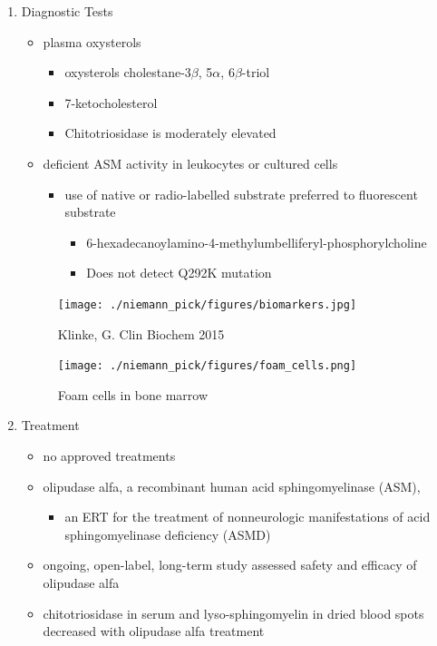 \documentclass{scrartcl}
\begin{document}
\begin{enumerate}
\item Diagnostic Tests
\label{sec:org111b475}
\begin{itemize}
\item plasma oxysterols
\begin{itemize}
\item oxysterols cholestane-3\(\beta\), 5\(\alpha\), 6\(\beta\)-triol
\item 7-ketocholesterol
\item Chitotriosidase is moderately elevated
\end{itemize}
\item deficient ASM activity in leukocytes or cultured cells
\begin{itemize}
\item use of native or radio-labelled substrate preferred to fluorescent substrate
\begin{itemize}
\item 6-hexadecanoylamino-4-methylumbelliferyl-phosphorylcholine
\item Does not detect Q292K mutation
\end{itemize}
\end{itemize}
\end{itemize}

\begin{figure}[htbp]
\centering
\texttt{[image: ./niemann\_pick/figures/biomarkers.jpg]}
\caption{\label{fig:org60a1e66}
Klinke, G. Clin Biochem 2015}
\end{figure}

\begin{figure}[htbp]
\centering
\texttt{[image: ./niemann\_pick/figures/foam\_cells.png]}
\caption{\label{fig:orga623e52}
Foam cells in bone marrow}
\end{figure}

\item Treatment
\label{sec:org5977ef0}
\begin{itemize}
\item no approved treatments
\item olipudase alfa, a recombinant human acid sphingomyelinase (ASM),
\begin{itemize}
\item an ERT for the treatment of nonneurologic manifestations of acid sphingomyelinase deficiency (ASMD)
\end{itemize}
\item ongoing, open-label, long-term study assessed safety and efficacy of olipudase alfa
\item chitotriosidase in serum and lyso-sphingomyelin in dried blood spots
decreased with olipudase alfa treatment
\end{itemize}
\end{enumerate}
\end{document}
